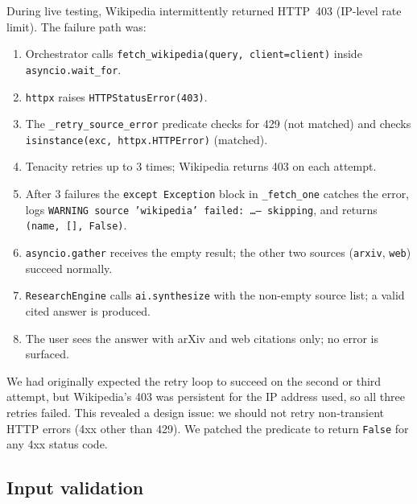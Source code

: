\documentclass[11pt,a4paper]{article}
\begin{document}
During live testing, Wikipedia intermittently returned HTTP~403 (IP-level rate limit). The failure path was:
\begin{enumerate}[noitemsep]
  \item Orchestrator calls \texttt{fetch\_wikipedia(query, client=client)} inside \texttt{asyncio.wait\_for}.
  \item \texttt{httpx} raises \texttt{HTTPStatusError(403)}.
  \item The \texttt{\_retry\_source\_error} predicate checks for 429 (not matched) and checks \texttt{isinstance(exc, httpx.HTTPError)} (matched).
  \item Tenacity retries up to 3 times; Wikipedia returns 403 on each attempt.
  \item After 3 failures the \texttt{except Exception} block in \texttt{\_fetch\_one} catches the error, logs \texttt{WARNING source 'wikipedia' failed: \ldots -- skipping}, and returns \texttt{(name, [], False)}.
  \item \texttt{asyncio.gather} receives the empty result; the other two sources (\texttt{arxiv}, \texttt{web}) succeed normally.
  \item \texttt{ResearchEngine} calls \texttt{ai.synthesize} with the non-empty source list; a valid cited answer is produced.
  \item The user sees the answer with arXiv and web citations only; no error is surfaced.
\end{enumerate}
We had originally expected the retry loop to succeed on the second or third attempt, but Wikipedia's 403 was persistent for the IP address used, so all three retries failed. This revealed a design issue: we should not retry non-transient HTTP errors (4xx other than 429). We patched the predicate to return \texttt{False} for any 4xx status code.

\subsection{Input validation}
\end{document}
